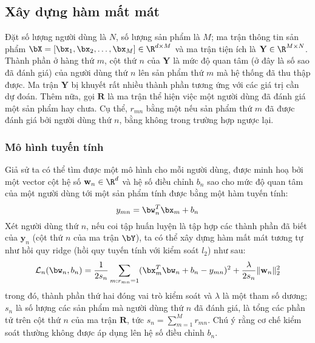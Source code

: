  
\subsection{Xây dựng hàm mất mát}
 
Đặt số lượng người dùng là $N$, số lượng sản phẩm là $M$; ma
trận thông tin sản phẩm $\bX = [\bx_1, \bx_2, \dots, \bx_M] \in\R^{d\times M}$ và ma
trận tiện ích là $\mathbf{Y} \in \R^{M \times N}$. Thành phần ở hàng thứ $m$, cột
thứ $n$ của $\mathbf{Y}$ là {mức độ quan tâm} (ở đây là số sao đã
đánh giá) của người dùng thứ $n$ lên sản phẩm thứ $m$ mà hệ thống
đã thu
thập được. Ma trận $\mathbf{Y}$ bị khuyết rất nhiều thành phần tương ứng với các
giá trị cần dự đoán. Thêm nữa, gọi $\mathbf{R}$ là ma trận thể hiện việc một người dùng đã đánh giá một
sản phẩm hay chưa. Cụ thể, $r_{mn}$ bằng một nếu sản phẩm thứ $m$ đã
được đánh giá bởi người dùng thứ $n$, bằng không trong trường hợp ngược
lại. 

\subsubsection{Mô hình tuyến tính} 
 
Giả sử ta có thể tìm được một mô hình cho mỗi người dùng, được minh hoạ
bởi một vector cột hệ số $\mathbf{w}_n \in \R^d$ và hệ số điều chỉnh $b_n$ sao cho
{mức độ quan tâm} của một người dùng tới một sản phẩm tính
được bằng một hàm tuyến tính:
\begin{equation} 
\label{eqn:23_1}
    y_{mn} = \bw_n^T\bx_m + b_n
\end{equation} 
Xét người dùng thứ $n$, nếu coi tập huấn luyện là tập hợp các
thành phần đã biết của $\mathbf{y}_n$ (cột thứ $n$ của ma
trận $\bY$), ta có thể xây dựng hàm mất
mát tương tự như hồi quy {ridge} (hồi quy tuyến tính với kiểm soát $l_2$) như sau:
\begin{equation} 
\label{eqn:23_1}
\mathcal{L}_n(\bw_n, b_n) = \frac{1}{2s_n} \sum_{m:r_{mn} = 1}(\bx_m^T\bw_n +
b_n
- y_{mn})^2
+ \frac{\lambda}{2s_n} \|\mathbf{w}_n\|_2^2
\end{equation} 
trong đó, thành phần thứ hai đóng vai trò kiểm soát và $\lambda$ là một tham số
dương; $s_n$ là số lượng các sản phẩm mà người dùng thứ $n$ đã đánh giá,
là tổng các phần tử trên cột thứ $n$ của ma trận $\mathbf{R}$, tức $s_n =
\sum_{m=1}^M r_{mn}$. Chú ý rằng cơ chế kiểm soát thường không được áp dụng lên
hệ số điều chỉnh $b_n$.
 

